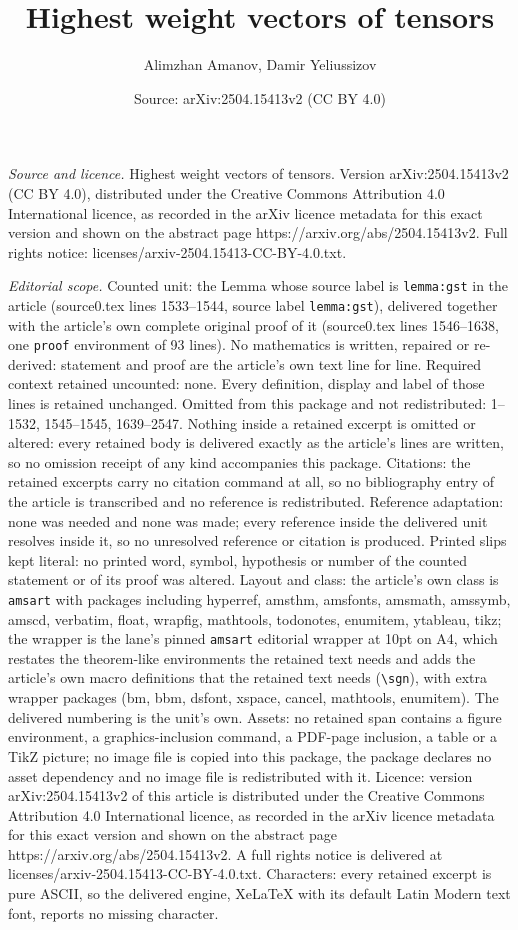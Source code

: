 \documentclass[10pt,a4paper]{amsart}
\title[Highest weight vectors of tensors]{Highest weight vectors of tensors}
\author{Alimzhan Amanov, Damir Yeliussizov}
\date{Source: arXiv:2504.15413v2 (CC BY 4.0)}
\begin{document}
\maketitle

\noindent\emph{Source and licence.} Highest weight vectors of tensors. Version arXiv:2504.15413v2 (CC BY 4.0), distributed under the Creative Commons Attribution 4.0 International licence, as recorded in the arXiv licence metadata for this exact version and shown on the abstract page https://arxiv.org/abs/2504.15413v2. Full rights notice: licenses/arxiv-2504.15413-CC-BY-4.0.txt.\par\smallskip

\noindent\textit{Editorial scope.} Counted unit: the Lemma whose source label is \texttt{lemma:gst} in the article (source0.tex lines 1533--1544, source label \texttt{lemma:gst}), delivered together with the article's own complete original proof of it (source0.tex lines 1546--1638, one \texttt{proof} environment of 93 lines). No mathematics is written, repaired or re-derived: statement and proof are the article's own text line for line. Required context retained uncounted: none. Every definition, display and label of those lines is retained unchanged. Omitted from this package and not redistributed: 1--1532, 1545--1545, 1639--2547. Nothing inside a retained excerpt is omitted or altered: every retained body is delivered exactly as the article's lines are written, so no omission receipt of any kind accompanies this package. Citations: the retained excerpts carry no citation command at all, so no bibliography entry of the article is transcribed and no reference is redistributed. Reference adaptation: none was needed and none was made; every reference inside the delivered unit resolves inside it, so no unresolved reference or citation is produced. Printed slips kept literal: no printed word, symbol, hypothesis or number of the counted statement or of its proof was altered. Layout and class: the article's own class is \texttt{amsart} with packages including hyperref, amsthm, amsfonts, amsmath, amssymb, amscd, verbatim, float, wrapfig, mathtools, todonotes, enumitem, ytableau, tikz; the wrapper is the lane's pinned \texttt{amsart} editorial wrapper at 10pt on A4, which restates the theorem-like environments the retained text needs and adds the article's own macro definitions that the retained text needs (\texttt{\textbackslash sgn}), with extra wrapper packages (bm, bbm, dsfont, xspace, cancel, mathtools, enumitem). The delivered numbering is the unit's own. Assets: no retained span contains a figure environment, a graphics-inclusion command, a PDF-page inclusion, a table or a TikZ picture; no image file is copied into this package, the package declares no asset dependency and no image file is redistributed with it. Licence: version arXiv:2504.15413v2 of this article is distributed under the Creative Commons Attribution 4.0 International licence, as recorded in the arXiv licence metadata for this exact version and shown on the abstract page https://arxiv.org/abs/2504.15413v2. A full rights notice is delivered at licenses/arxiv-2504.15413-CC-BY-4.0.txt. Characters: every retained excerpt is pure ASCII, so the delivered engine, XeLaTeX with its default Latin Modern text font, reports no missing character.
\end{document}
